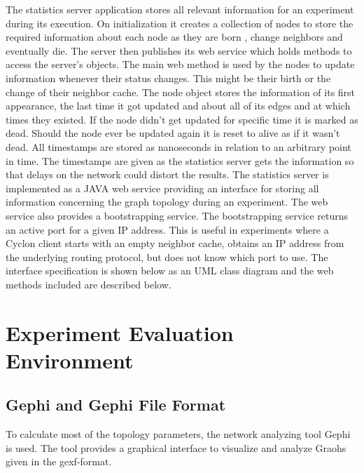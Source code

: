 The statistics server application stores all relevant information for an
experiment during its execution. On initialization it creates a collection of
nodes to store the required information about each node as they are born ,
change neighbors and eventually die. The server then publishes its web service
which holds methods to access the server's objects. The main web method is used
by the nodes to update information whenever their status changes. This might be
their birth or the change of their neighbor cache. The node object stores the
information of its first appearance, the last time it got updated and about all
of its edges and at which times they existed. If the node didn't get updated for
specific time it is marked as dead. Should the node ever be updated again it is
reset to alive as if it wasn't dead. All timestamps are stored as nanoseconds in
relation to an arbitrary point in time. The timestamps are given as the
statistics server gets the information so that delays on the network could
distort the results.
The statistics server is implemented as a JAVA web service providing an
interface for storing all information concerning the graph topology during an
experiment. The web service also provides a bootstrapping service. The
bootstrapping service returns an active port for a given IP address. This is
useful in experiments where a Cyclon client starts with an empty neighbor
cache, obtains an IP address from the underlying routing protocol, but does not
know which port to use. The interface specification is shown below
as an UML class diagram and the web methods included are described below.

\section{Experiment Evaluation Environment}

\subsection{Gephi and Gephi File Format}
To calculate most of the topology parameters, the network analyzing tool Gephi
is used. The tool provides a graphical interface to visualize and analyze Graohs
given in the gexf-format. 
